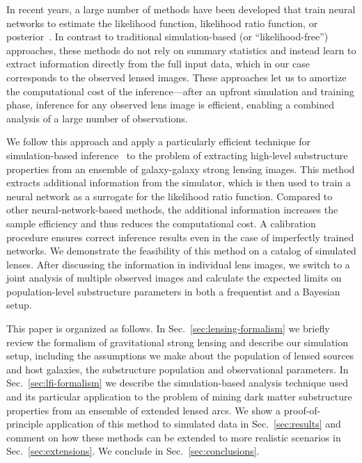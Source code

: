 \documentclass[twocolumn]{aastex62}
\begin{document}
In recent years, a large number of methods have been developed that train neural networks to estimate the likelihood function, likelihood ratio function, or posterior~\citep{2012arXiv1212.1479F, 2014arXiv1410.8516D, 2015arXiv150203509G, 2015arXiv150505770J, Cranmer:2015bka,  2016arXiv160206701P, 2016arXiv160502226U, 2016arXiv160508803D, 2016arXiv160605328V, 2016arXiv160903499V, 2016arXiv160106759V, 2016arXiv161110242D, NIPS2016_6084, 2017arXiv170208896T, 2017arXiv170507057P, 2017arXiv170707113L, 2017arXiv171101861L, gutmann2017likelihood, 2018arXiv180400779H, 2018arXiv180507226P, 2018arXiv180509294L, DBLP:journals/corr/abs-1806-07366, 2018arXiv180703039K, 2018arXiv181001367G, 2018arXiv181009899D, Hermans:2019ioj, Alsing:2019xrx}.  In contrast to traditional simulation-based (or ``likelihood-free'') approaches, these methods do not rely on summary statistics and instead learn to extract information directly from the full input data, which in our case corresponds to the observed lensed images. These approaches let us to amortize the computational cost of the inference---after an upfront simulation and training phase, inference for any observed lens image is efficient, enabling a combined analysis of a large number of observations.

We follow this approach and apply a particularly efficient technique for simulation-based inference~\citep{1805.00013, 1805.00020, 1805.12244, Stoye:2018ovl} to the problem of extracting high-level substructure properties from an ensemble of galaxy-galaxy strong lensing images. This method extracts additional information from the simulator, which is then used to train a neural network as a surrogate for the likelihood ratio function. Compared to other neural-network-based methods, the additional information increases the sample efficiency and thus reduces the computational cost. A calibration procedure ensures correct inference results even in the case of imperfectly trained networks. We demonstrate the feasibility of this method on a catalog of simulated lenses. After discussing the information in individual lens images, we switch to a joint analysis of multiple observed images and calculate the expected limits on population-level substructure parameters in both a frequentist and a Bayesian setup.

This paper is organized as follows. In Sec.~\ref{sec:lensing-formalism} we briefly review the formalism of gravitational strong lensing and describe our simulation setup, including the assumptions we make about the population of lensed sources and host galaxies, the substructure population and observational parameters. In Sec.~\ref{sec:lfi-formalism} we describe the simulation-based analysis technique used and its particular application to the problem of mining dark matter substructure properties from an ensemble of extended lensed arcs. We show a proof-of-principle application of this method to simulated data in Sec.~\ref{sec:results} and comment on how these methods can be extended to more realistic scenarios in Sec.~\ref{sec:extensions}. We conclude in Sec.~\ref{sec:conclusions}.
\end{document}
